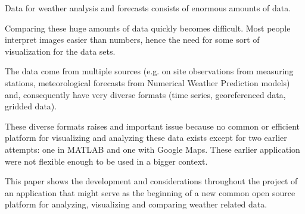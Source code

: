 Data for weather analysis and forecasts consists of enormous amounts of data.

Comparing these huge amounts of data quickly becomes difficult. Most people interpret images easier than numbers, hence the need for some sort of visualization for the data sets.

The data come from multiple sources (e.g. on site observations from measuring stations, meteorological forecasts from Numerical Weather Prediction models) and, consequently have very diverse formats (time series, georeferenced data, gridded data).

These diverse formats raises and important issue because no common or efficient platform for visualizing and analyzing these data exists except for two earlier attempts: one in MATLAB and one with Google Maps. These earlier application were not flexible enough to be used in a bigger context.

This paper shows the development and considerations throughout the project of an application that might serve as the beginning of a new common open source platform for analyzing, visualizing and comparing weather related data.